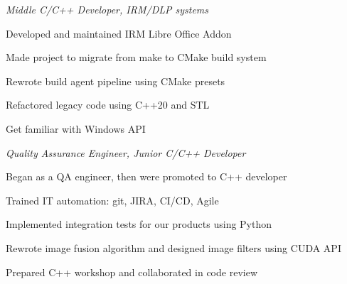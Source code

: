 \documentclass[
  a4paper, 
   maincolor=cvblue,
   sectioncolor=cvblue,
]{fortysecondscv}
\begin{document}





\newpage
\restoregeometry
{}\paperwidth

\makefrontsidebar

\begin{cvtable}
	{\textit{Middle C/C++ Developer, IRM/DLP systems}
	\normalsize 
	\begin{itemize-noindent}
		\item Developed and maintained IRM Libre Office Addon
		\item Made project to migrate from make to CMake build system
		\item Rewrote build agent pipeline using CMake presets
		\item Refactored legacy code using C++20 and STL
		\item Get familiar with Windows API
	\end{itemize-noindent}
	}

	{\textit{Quality Assurance Engineer, Junior C/C++ Developer}
	\normalsize 
	\begin{itemize-noindent}
		\item Began as a QA engineer, then were promoted to C++ developer
		\item Trained IT automation: git, JIRA, CI/CD, Agile
		\item Implemented integration tests for our products using Python
		\item Rewrote image fusion algorithm and designed image filters using CUDA API
		\item Prepared C++ workshop and collaborated in code review
	\end{itemize-noindent}
	}
	

\end{cvtable}
\end{document}
